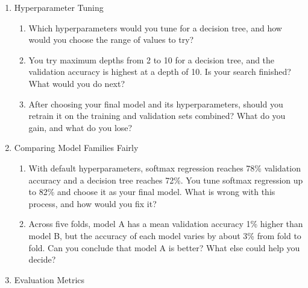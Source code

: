 \documentclass[12pt]{article}
\begin{document}
\begin{enumerate}
\begin{enumerate}
\item What is cross validation? If we want to use cross validation, why should we use grouped cross validation, grouped by the unique ID?

\item Pre-processing steps such as normalization and text vectorization learn values from the data, like a mean or a vocabulary. Which part of the data should these values be computed from during cross validation, and why?

\end{enumerate}

\item Hyperparameter Tuning

\begin{enumerate}

\item Which hyperparameters would you tune for a decision tree, and how would you choose the range of values to try?

\item You try maximum depths from 2 to 10 for a decision tree, and the validation accuracy is highest at a depth of 10. Is your search finished? What would you do next?

\item After choosing your final model and its hyperparameters, should you retrain it on the training and validation sets combined? What do you gain, and what do you lose?

\end{enumerate}

\item Comparing Model Families Fairly

\begin{enumerate}

\item With default hyperparameters, softmax regression reaches 78\% validation accuracy and a decision tree reaches 72\%. You tune softmax regression up to 82\% and choose it as your final model. What is wrong with this process, and how would you fix it?

\item Across five folds, model A has a mean validation accuracy 1\% higher than model B, but the accuracy of each model varies by about 3\% from fold to fold. Can you conclude that model A is better? What else could help you decide?

\end{enumerate}

\item Evaluation Metrics


\end{enumerate}
\end{document}
